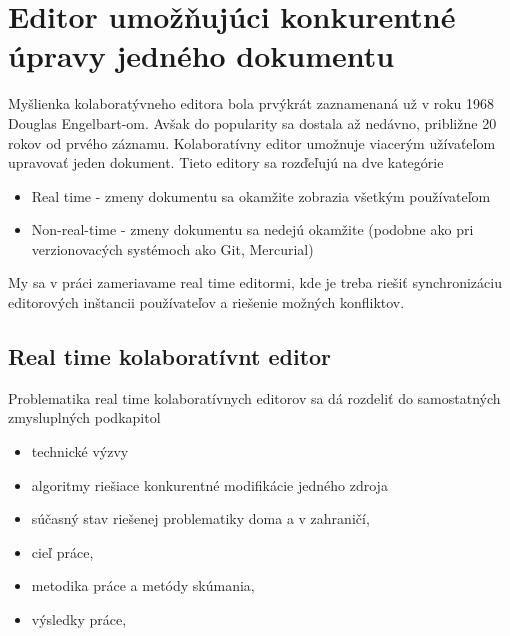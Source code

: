 \chapter{Editor umožňujúci konkurentné úpravy jedného dokumentu}

\label{kap:zdialtelnost} %

Myšlienka kolaboratývneho editora bola prvýkrát zaznamenaná už v roku 1968 Douglas Engelbart-om. 
Avšak do popularity sa dostala až nedávno, približne 20 rokov od prvého záznamu.
Kolaboratívny editor umožnuje viacerým užívaťeľom upravovať jeden dokument.
Tieto editory sa rozďeľujú na dve kategórie
\begin{itemize}
  \item Real time - zmeny dokumentu sa okamžite zobrazia všetkým používateľom
  \item Non-real-time - zmeny dokumentu sa nedejú okamžite (podobne ako pri verzionovacých
  systémoch ako Git, Mercurial)
\end{itemize}
My sa v práci zameriavame real time editormi, kde je treba riešiť synchronizáciu editorových
inštancii používateľov a riešenie možných konfliktov.

\section{Real time kolaboratívnt editor}
Problematika real time kolaboratívnych editorov sa dá rozdeliť do samostatných zmysluplných 
podkapitol
\begin{itemize}
\item  technické výzvy
\item  algoritmy riešiace konkurentné modifikácie jedného zdroja
\item  súčasný stav riešenej problematiky doma a v zahraničí,
\item  cieľ práce,
\item  metodika práce a metódy skúmania,
\item  výsledky práce, 
\end{itemize}

